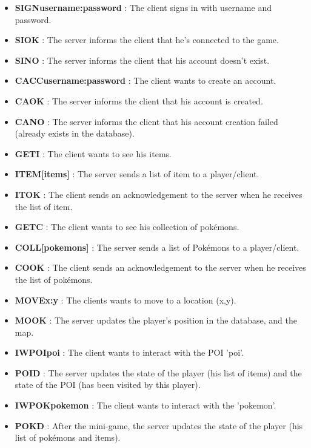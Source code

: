 \documentclass[a4paper,09pt]{article}
\begin{document}
\begin{itemize}
\item \textbf{SIGNusername:password} : The client signs in with username and password.
\item \textbf{SIOK} : The server informs the client that he's connected to the game.
\item \textbf{SINO} : The server informs the client that his account doesn't exist.
\item \textbf{CACCusername:password} : The client wants to create an account.
\item \textbf{CAOK} : The server informs the client that his account is created.
\item \textbf{CANO} : The server informs the client that his account creation
  failed (already exists in the database).\\
\item \textbf{GETI} : The client wants to see his items.
\item \textbf{ITEM[items]} : The server sends a list of item to a player/client.
\item \textbf{ITOK} : The client sends an acknowledgement to the server when he
  receives the list of item.
\item \textbf{GETC} : The client wants to see his collection of pokémons.
\item \textbf{COLL[pokemons]} : The server sends a list of Pokémons to a player/client.
\item \textbf{COOK} : The client sends an acknowledgement to the server when he
  receives the list of pokémons.
\item \textbf{MOVEx:y} : The clients wants to move to a location (x,y).
\item \textbf{MOOK} : The server updates the player's position in the
  database, and the map.\\
\item \textbf{IWPOIpoi} : The client wants to interact with the POI 'poi'.
\item \textbf{POID} : The server updates the state of the player (his list of items)
  and the state of the POI (has been visited by this player).
\item \textbf{IWPOKpokemon} : The client wants to interact with the 'pokemon'.
\item \textbf{POKD} : After the mini-game, the server updates the state of the player
  (his list of pokémons and items).
\end{itemize}
\end{document}
